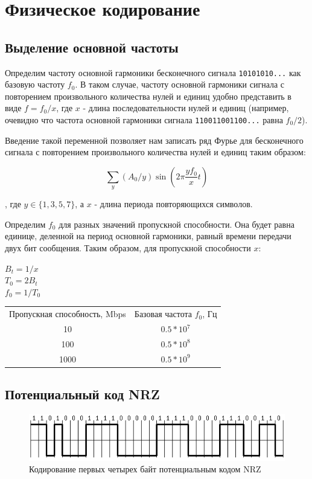 \documentclass[12pt, a4paper]{article}
\begin{document}
\section{Физическое кодирование}

\subsection{Выделение основной частоты}

Определим частоту основной гармоники бесконечного сигнала \texttt{10101010...}
как базовую частоту $f_0$. В таком случае, частоту основной гармоники сигнала
с повторением произвольного количества нулей и единиц удобно представить в
виде $f = f_0 / x$, где $x$ - длина последовательности нулей и единиц (например,
очевидно что частота основной гармоники сигнала \texttt{110011001100...} равна
$f_0 / 2$).

Введение такой переменной позволяет нам записать ряд Фурье для бесконечного
сигнала с повторением произвольного количества нулей и единиц таким образом:

$$\sum_y (A_0 / y) \sin (2 \pi \frac{y f_0}{x} t)$$

, где $y \in \{ 1, 3, 5, 7 \}$, а $x$ - длина периода повторяющихся символов.

Определим $f_0$ для разных значений пропускной способности. Она будет равна
единице, деленной на период основной гармоники, равный времени передачи двух
бит сообщения. Таким образом, для пропускной способности $x$:

\newpage

\noindent $B_t = 1 / x$ \\
$T_0 = 2 B_t$ \\
$f_0 = 1 / T_0$ \\

\begin{tabular}{ c | c }
  Пропускная способность, Mbps & Базовая частота $f_0$, Гц \\
  10 & $0.5 * 10^7$ \\
  100 & $0.5 * 10^8$ \\
  1000 & $0.5 * 10^9$
\end{tabular}

\subsection{Потенциальный код NRZ}

\begin{figure}[h]
  \begin{center}
    \includegraphics{nrz}
    \caption{Кодирование первых четырех байт потенциальным кодом NRZ}
  \end{center}
\end{figure}
\end{document}
